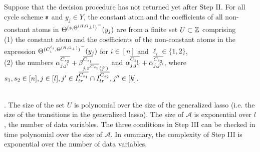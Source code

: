 \begin{lemma}\label{prop-bnd-domain-2}
	Suppose that the decision procedure has not returned yet after Step II. 
	For all cycle scheme ${\mathfrak{s} }$ and $y_j \in Y$, the constant atom and the coefficients of all non-constant atoms in ${\Theta^{({\mathfrak{s} }, \Theta^{(H,\Omega_\bot)})}}^-(y_j)$ are from a finite set $U \subset {\mathbb{Z} }$ comprising \\ (1)
	the constant atom and the coefficients of the non-constant atoms in the expression ${\Theta^{(C^{\ell_i}_{i}, \Theta^{(H,\Omega_\bot)})}}^-(y_j)$ for $i\in [n]$ and $\ell_i \in \{1,2\}$,\smallskip\\(2) the numbers $\alpha^{\overline{C_{s_2}}}_{j,j'} + \beta^{\overline{C_{s_1}}}_{j,\pi^{\overline{C_{s_1}}}(j')}$ and $\alpha^{\overline{C_{s_1}}}_{j, j''} + \alpha^{\overline{C_{s_2}}}_{j,j''}$, where  $s_1,s_2 \in [n], j\in[l],j' \in I^{\overline{C_{s_1}}}_{tr} \cap I^{\overline{C_{s_2}}}_{tr},  j'' \in [k]$. 
	
	
\end{lemma}
\smallskip\\

. The size of the set $U$ is polynomial over the size of the generalized lasso (i.e. the size of the transitions in the generalized lasso). The size of $\mathscr{A}$ is exponential over $l$, the number of data variables. The three conditions in Step III can be checked in time polynomial over the size of $\mathscr{A}$. In summary, the complexity of Step III is exponential over the number of data variables.


